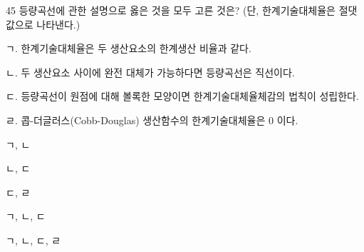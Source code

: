 \begin{question}{45}
등량곡선에 관한 설명으로 옳은 것을 모두 고른 것은? (단, 한계기술대체율은 절댓값으로 나타낸다.)
\begin{framedtext}
ㄱ. 한계기술대체율은 두 생산요소의 한계생산 비율과 같다. \par
ㄴ. 두 생산요소 사이에 완전 대체가 가능하다면 등량곡선은 직선이다. \par
ㄷ. 등량곡선이 원점에 대해 볼록한 모양이면 한계기술대체율체감의 법칙이 성립한다. \par
ㄹ. 콥-더글러스(Cobb-Douglas) 생산함수의 한계기술대체율은 0 이다. \par
\end{framedtext}
\begin{choices}
  \item ㄱ, ㄴ
  \item ㄴ, ㄷ
  \item ㄷ, ㄹ
  \item ㄱ, ㄴ, ㄷ
  \item ㄱ, ㄴ, ㄷ, ㄹ
\end{choices}
\end{question}
